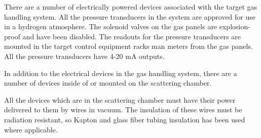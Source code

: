 \begin{safetyen}{0}{0}
{There are a number of electrically powered devices associated with
the target gas handling system. All the pressure transducers in the
system are approved for use in a hydrogen atmosphere. The solenoid
valves on the gas panels are explosion-proof and have been disabled.
The readouts for the pressure transducers are mounted in the target
control equipment racks man meters from the gas panels. All the pressure
transducers have 4-20 mA outputs.

In addition to the electrical devices in the gas handling system,
there are a number of devices inside of or mounted on the scattering
chamber.

All the devices which are in the scattering chamber must have their
power delivered to them by wires in vacuum. The insulation of these
wires must be radiation resistant, so Kapton and glass fiber tubing
insulation has been used where applicable.

}
\end{safetyen}
